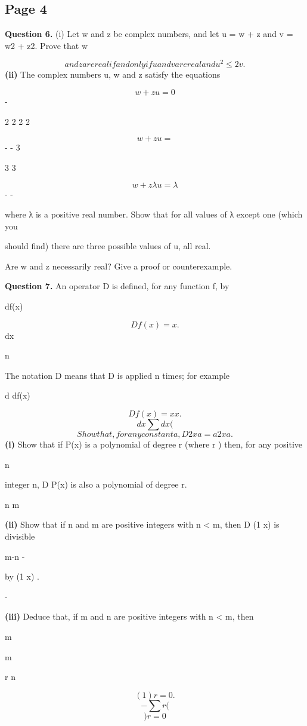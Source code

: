 \documentclass[12pt]{article}
\begin{document}
\subsection*{Page 4}
\begin{flushleft}
\bigskip\textbf{Question 6.} (i) Let w and z be complex numbers, and let u = w + z and v = w2 + z2. Prove that w\par
\[and z are real if and only if u and v are real and u^2 \leq 2v.\]
\textbf{(ii)} The complex numbers u, w and z satisfy the equations\par
\[w + z u = 0\]
-\par
2 2 2 2\par
\[w + z u =\]
- - 3\par
3 3\par
\[w + z λu = λ\]
- -\par
where λ is a positive real number. Show that for all values of λ except one (which you\par
should find) there are three possible values of u, all real.\par
Are w and z necessarily real? Give a proof or counterexample.\par
\bigskip\textbf{Question 7.} An operator D is defined, for any function f, by\par
df(x)\par
\[Df(x) = x .\]
dx\par
n\par
The notation D means that D is applied n times; for example\par
d df(x)\par
\[D f(x) = x x .\]
\[dx \sum dx (\]
\[Show that, for any constant a, D2x a = a2x a .\]
\textbf{(i)} Show that if P(x) is a polynomial of degree r (where r ) then, for any positive\par
n\par
integer n, D P(x) is also a polynomial of degree r.\par
n m\par
\textbf{(ii)} Show that if n and m are positive integers with n < m, then D (1 x) is divisible\par
m-n -\par
by (1 x) .\par
-\par
\textbf{(iii)} Deduce that, if m and n are positive integers with n < m, then\par
m\par
m\par
r n\par
\[( 1) r = 0 .\]
\[- \sum r (\]
\[)r=0\]
\end{flushleft}
\end{document}

